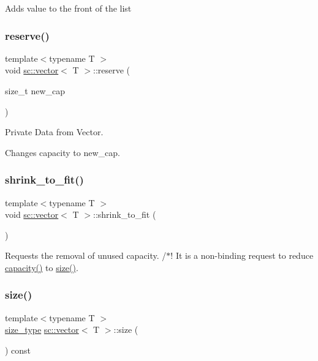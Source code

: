 Adds value to the front of the list \mbox{\label{classsc_1_1vector_afd98588509a1f15ce5621735f69b01bf}} 
\subsubsection{\texorpdfstring{reserve()}{reserve()}}
{\footnotesize\ttfamily template$<$typename T $>$ \\
void \hyperlink{classsc_1_1vector}{sc\+::vector}$<$ T $>$\+::reserve (\begin{DoxyParamCaption}\item[{size\+\_\+t}]{new\+\_\+cap }\end{DoxyParamCaption})\hspace{0.3cm}{\ttfamily [inline]}}



Private Data from Vector. 

Changes capacity to \textquotesingle{}new\+\_\+cap\textquotesingle{}. \mbox{\label{classsc_1_1vector_aaeb01dacb26f39fb08cffc6f274284fd}} 
\subsubsection{\texorpdfstring{shrink\+\_\+to\+\_\+fit()}{shrink\_to\_fit()}}
{\footnotesize\ttfamily template$<$typename T $>$ \\
void \hyperlink{classsc_1_1vector}{sc\+::vector}$<$ T $>$\+::shrink\+\_\+to\+\_\+fit (\begin{DoxyParamCaption}{ }\end{DoxyParamCaption})\hspace{0.3cm}{\ttfamily [inline]}}

Requests the removal of unused capacity. /$\ast$! It is a non-\/binding request to reduce \hyperlink{classsc_1_1vector_a318c4ab34bd9605214e99db94c4258a9}{capacity()} to \hyperlink{classsc_1_1vector_a1a2113e8d3d4c1494a929d55237d6dde}{size()}. \mbox{\label{classsc_1_1vector_a1a2113e8d3d4c1494a929d55237d6dde}} 
\subsubsection{\texorpdfstring{size()}{size()}}
{\footnotesize\ttfamily template$<$typename T $>$ \\
\hyperlink{classsc_1_1vector_a48bf37ba1a6d0c13504414d86e27c399}{size\+\_\+type} \hyperlink{classsc_1_1vector}{sc\+::vector}$<$ T $>$\+::size (\begin{DoxyParamCaption}{ }\end{DoxyParamCaption}) const\hspace{0.3cm}{\ttfamily [inline]}}



